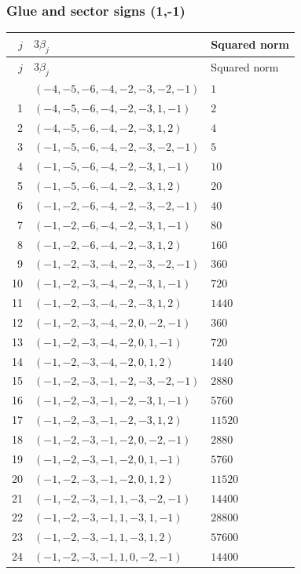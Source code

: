 \subsubsection{Glue and sector signs (1,-1)}

\begingroup\scriptsize
\setlength{\tabcolsep}{5pt}
\begin{longtable}{@{}rll@{}}
\toprule
$j$ & $3\beta_j$ & Squared norm\\
\midrule\endfirsthead
\toprule
$j$ & $3\beta_j$ & Squared norm\\
\midrule\endhead
\bottomrule\endfoot
0 & $(-4,-5,-6,-4,-2,-3,-2,-1)$ & $1$\\
1 & $(-4,-5,-6,-4,-2,-3,1,-1)$ & $2$\\
2 & $(-4,-5,-6,-4,-2,-3,1,2)$ & $4$\\
3 & $(-1,-5,-6,-4,-2,-3,-2,-1)$ & $5$\\
4 & $(-1,-5,-6,-4,-2,-3,1,-1)$ & $10$\\
5 & $(-1,-5,-6,-4,-2,-3,1,2)$ & $20$\\
6 & $(-1,-2,-6,-4,-2,-3,-2,-1)$ & $40$\\
7 & $(-1,-2,-6,-4,-2,-3,1,-1)$ & $80$\\
8 & $(-1,-2,-6,-4,-2,-3,1,2)$ & $160$\\
9 & $(-1,-2,-3,-4,-2,-3,-2,-1)$ & $360$\\
10 & $(-1,-2,-3,-4,-2,-3,1,-1)$ & $720$\\
11 & $(-1,-2,-3,-4,-2,-3,1,2)$ & $1440$\\
12 & $(-1,-2,-3,-4,-2,0,-2,-1)$ & $360$\\
13 & $(-1,-2,-3,-4,-2,0,1,-1)$ & $720$\\
14 & $(-1,-2,-3,-4,-2,0,1,2)$ & $1440$\\
15 & $(-1,-2,-3,-1,-2,-3,-2,-1)$ & $2880$\\
16 & $(-1,-2,-3,-1,-2,-3,1,-1)$ & $5760$\\
17 & $(-1,-2,-3,-1,-2,-3,1,2)$ & $11520$\\
18 & $(-1,-2,-3,-1,-2,0,-2,-1)$ & $2880$\\
19 & $(-1,-2,-3,-1,-2,0,1,-1)$ & $5760$\\
20 & $(-1,-2,-3,-1,-2,0,1,2)$ & $11520$\\
21 & $(-1,-2,-3,-1,1,-3,-2,-1)$ & $14400$\\
22 & $(-1,-2,-3,-1,1,-3,1,-1)$ & $28800$\\
23 & $(-1,-2,-3,-1,1,-3,1,2)$ & $57600$\\
24 & $(-1,-2,-3,-1,1,0,-2,-1)$ & $14400$\\

\end{longtable}
